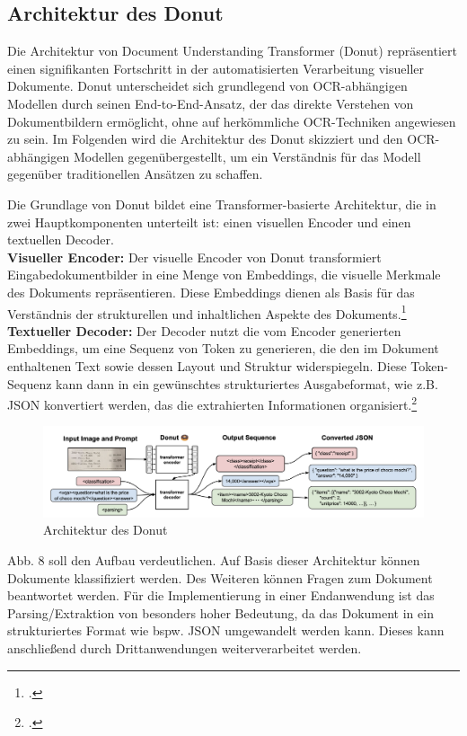 \subsection{Architektur des Donut}
Die Architektur von Document Understanding Transformer (Donut) repräsentiert einen signifikanten Fortschritt in der automatisierten Verarbeitung visueller Dokumente. Donut unterscheidet sich grundlegend von OCR-abhängigen Modellen durch seinen End-to-End-Ansatz, der das direkte Verstehen von Dokumentbildern ermöglicht, ohne auf herkömmliche OCR-Techniken angewiesen zu sein. Im Folgenden wird die Architektur des Donut skizziert und den OCR-abhängigen Modellen gegenübergestellt, um ein Verständnis für das Modell gegenüber traditionellen Ansätzen zu schaffen.

Die Grundlage von Donut bildet eine Transformer-basierte Architektur, die in zwei Hauptkomponenten unterteilt ist: einen visuellen Encoder und einen textuellen Decoder.\\
\textbf{Visueller Encoder:} Der visuelle Encoder von Donut transformiert Eingabedokumentbilder in eine Menge von Embeddings, die visuelle Merkmale des Dokuments repräsentieren. Diese Embeddings dienen als Basis für das Verständnis der strukturellen und inhaltlichen Aspekte des Dokuments.\footcites[Vgl.][S. 4]{kim_ocr-free_2021}\\
\textbf{Textueller Decoder:} Der Decoder nutzt die vom Encoder generierten Embeddings, um eine Sequenz von Token zu generieren, die den im Dokument enthaltenen Text sowie dessen Layout und Struktur widerspiegeln. Diese Token-Sequenz kann dann in ein gewünschtes strukturiertes Ausgabeformat, wie z.B. \ac{JSON} konvertiert werden, das die extrahierten Informationen organisiert.\footcites[Vgl.][S. 5]{kim_ocr-free_2021}

\begin{figure}[]
    \centering
    \includegraphics[width=160mm]{graphics/donut-architecture.png}
    \caption[Architektur des Donut]{Architektur des Donut\footnotemark}
    \label{fig:donut-architecture}
\end{figure}
Abb. 8 soll den Aufbau verdeutlichen. Auf Basis dieser Architektur können Dokumente klassifiziert werden. Des Weiteren können Fragen zum Dokument beantwortet werden. Für die Implementierung in einer Endanwendung ist das Parsing/Extraktion von besonders hoher Bedeutung, da das Dokument in ein strukturiertes Format wie bspw. \ac{JSON} umgewandelt werden kann. Dieses kann anschließend durch Drittanwendungen weiterverarbeitet werden. 

